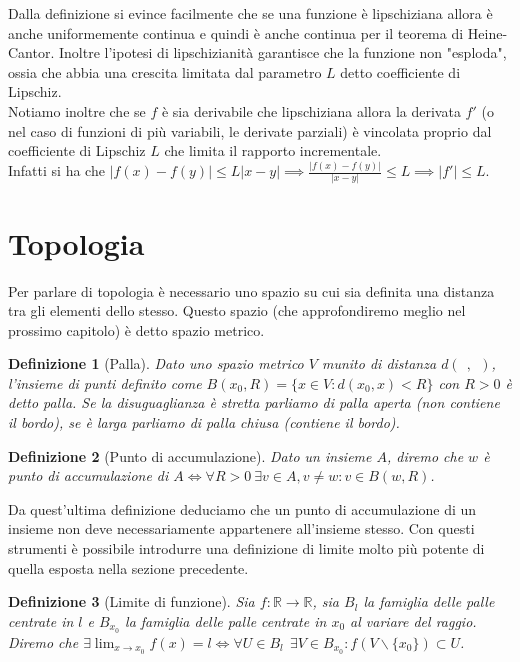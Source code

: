 \documentclass[a4paper,12pt]{report}
\newtheorem{definizione}{Definizione}[chapter]
\begin{document}
Dalla definizione si evince facilmente che se una funzione è lipschiziana allora è anche uniformemente continua e quindi è anche continua per il teorema di Heine-Cantor. Inoltre l'ipotesi di lipschizianità garantisce che la funzione non "esploda", ossia che abbia una crescita limitata dal parametro $L$ detto coefficiente di Lipschiz.
\\Notiamo inoltre che se $f$ è sia derivabile che lipschiziana allora la derivata $f'$ (o nel caso di funzioni di più variabili, le derivate parziali) è vincolata proprio dal coefficiente di Lipschiz $L$ che limita il rapporto incrementale.
\\Infatti si ha che $|f(x)-f(y)| \leq L|x-y| \implies \displaystyle\frac{|f(x)-f(y)|}{|x-y|} \leq L \implies |f'| \leq L$.


\section{Topologia}

Per parlare di topologia è necessario uno spazio su cui sia definita una distanza tra gli elementi dello stesso. Questo spazio (che approfondiremo meglio nel prossimo capitolo) è detto spazio metrico. 

\begin{definizione}[Palla]
    Dato uno spazio metrico $V$ munito di distanza $d( \ \ , \ \ )$, l'insieme di punti definito come $B(x_0, R)=\{x \in V:d(x_0,x)<R\}$ con $R >0 $ è detto palla. Se la disuguaglianza è stretta parliamo di palla aperta (non contiene il bordo), se è larga parliamo di palla chiusa (contiene il bordo).
\end{definizione}

\begin{definizione}[Punto di accumulazione]
    Dato un insieme $A$, diremo che $w$ è punto di accumulazione di $A \iff \forall R >0 \ \exists v \in A, v \neq w: v \in B(w,R)$.
\end{definizione}

Da quest'ultima definizione deduciamo che un punto di accumulazione di un insieme non deve necessariamente appartenere all'insieme stesso. Con questi strumenti è possibile introdurre una definizione di limite molto più potente di quella esposta nella sezione precedente.

\begin{definizione}[Limite di funzione]
    Sia $f:\mathbb{R} \to \mathbb{R}$, sia $B_l$ la famiglia delle palle centrate in $l$ e $B_{x_0}$ la famiglia delle palle centrate in $x_0$ al variare del raggio. 
    \\Diremo che $\exists \displaystyle\lim _{x \to x_0}f(x)=l \iff \forall U \in B_l\ \ \exists V \in B_{x_0}:f(V\backslash \{x_0\}) \subset U $.
\end{definizione}
\end{document}
